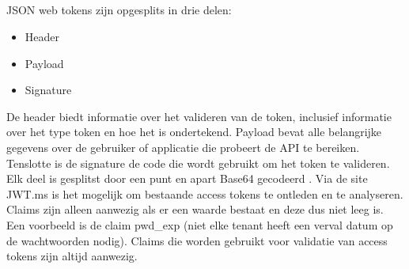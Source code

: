 \subsection{}
JSON web tokens zijn opgesplits in drie delen:
\begin{itemize}
	\item Header
	\item Payload
	\item Signature
\end{itemize}
De header biedt informatie over het valideren van de token, inclusief informatie over het type token en hoe het is ondertekend. Payload bevat alle belangrijke gegevens over de gebruiker of applicatie die probeert de API te bereiken. Tenslotte is de signature de code die wordt gebruikt om het token te valideren. Elk deel is gesplitst door een punt en apart Base64 gecodeerd \autocite{hpsin2020}.\newline
Via de site JWT.ms is het mogelijk om bestaande access tokens te ontleden en te analyseren. Claims zijn alleen aanwezig als er een waarde bestaat en deze dus niet leeg is. Een voorbeeld is de claim pwd\_exp (niet elke tenant heeft een verval datum op de wachtwoorden nodig). Claims die worden gebruikt voor validatie van access tokens zijn altijd aanwezig.
